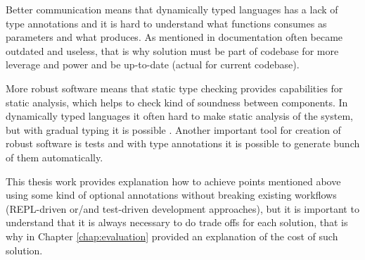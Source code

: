 Better communication means that dynamically typed languages has a lack of type
annotations and it is hard to understand what functions consumes as parameters
and what produces. As mentioned in \cite{janes2014lean} documentation often
became outdated and useless, that is why solution must be part of codebase for
more leverage and power and be up-to-date (actual for current codebase).

More robust software means that static type checking provides capabilities for
static analysis, which helps to check kind of soundness between components.
In dynamically typed languages it often hard to make static analysis of the
system, but with gradual typing it is possible \cite{tobin2008design}. Another
important tool for creation of robust software is tests and with type
annotations it is possible to generate bunch of them automatically.

This thesis work provides explanation how to achieve points mentioned above
using some kind of optional annotations without breaking existing workflows
(REPL-driven or/and test-driven development approaches), but it is important to
understand that it is always necessary to do trade offs for each solution, that
is why in Chapter \ref{chap:evaluation} provided an explanation of the cost of
such solution.










